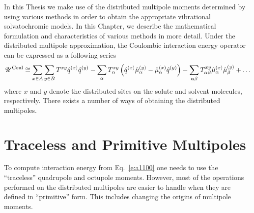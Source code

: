 \documentclass[a4paper,titlepage,twoside,fleqn,12pt]{book}
\begin{document}
\begin{appendices}
\begin{refsection}
In this Thesis we make use of the distributed multipole 
moments determined by using various methods in order to obtain
the appropriate vibrational solvatochromic models. In this Chapter,
we describe the mathematical formulation and characteristics of various methods
in more detail.
Under the distributed multipole approximation, the Coulombic
interaction energy operator can be expressed as a following series \citep{Stone.TheTheoryOfIntermolecularForces.1996}
%
\begin{equation} \label{e:a1100}
 \mathscr{U}^{\rm Coul} \cong \sum_{x\in A}\sum_{y\in B}  T^{xy}\hat{q}^{(x)}\hat{q}^{(y)} -
\sum_\alpha T^{xy}_\alpha \left( \hat{q}^{(x)} \hat{\mu}^{(y)}_\alpha - \hat{\mu}^{(x)}_\alpha \hat{q}^{(y)}\right)
 - \sum_{\alpha\beta} T^{xy}_{\alpha\beta} \hat{\mu}^{(x)}_\alpha \hat{\mu}^{(y)}_\beta + \ldots
\end{equation}
%
where $x$ and $y$ denote the distributed sites on the solute and solvent
molecules, respectively. There exists a number of ways of obtaining
the distributed multipoles. 

\section{Traceless and Primitive Multipoles}

To compute interaction energy from Eq.~\eqref{e:a1100} one needs 
to use the ``traceless'' quadrupole and octupole moments. However, 
most of the operations performed on the distributed multipoles
are easier to handle when they are defined in ``primitive'' form.
This includes changing the origins of multipole moments.


\end{refsection}
\end{appendices}
\end{document}
